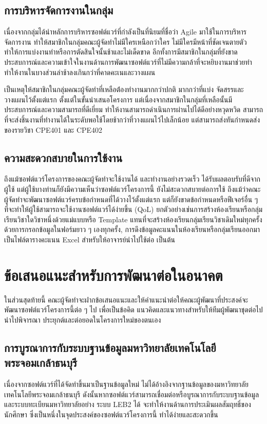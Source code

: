 \documentclass[12pt,one side,openright,a4paper]{cpe-thesis-th}
\newcommand{\thaijustify}[1]{%
  \par\hspace{30pt}\justifying
  #1
}
\begin{document}
    \subsection{การบริหารจัดการงานในกลุ่ม}
        \thaijustify{
            เนื่องจากกลุ่มได้นำหลักการบริหารซอฟต์แวร์ที่กำลังเป็นที่นิยมที่ชื่อว่า Agile มาใช้ในการบริหารจัดการงาน ทำให้สมาชิกในกลุ่มคณะผู้จัดทำไม่มีใครเหนือกว่าใคร ไม่มีใครมีหน้าที่ชัดเจนตายตัว ทำให้การแบ่งงานทำหรือการตัดสินใจนั้นช้าและไม่เด็ดขาด อีกทั้งการมีสมาชิกในกลุ่มที่ยังขาดประสบการณ์และความเข้าใจในงานด้านการพัฒนาซอฟต์แวร์ที่ไม่มีความกล้าที่จะหยิบงานมาช่วยทำ ทำให้งานในบางส่วนล่าช้าลงเกินกว่าที่คาดคะเนและวางแผน
        }
        \thaijustify{
            เป็นเหตุให้สมาชิกในกลุ่มคณะผู้จัดทำที่เหลือต้่องทำงานมากกว่าปกติ มากกว่าที่แบ่ง จัดสรรและวางแผนไว้ตั้งแต่แรก ตั้งแต่ในขั้นนำเสนอโครงการ แต่เนื่องจากสมาชิกในกลุ่มที่เหลือนั้นมีประสบการณ์และความสามารถที่ดีเยี่ยม ทำให้งานสามารถดำเนินการผ่านไปได้ดีอย่างหวุดหวิด สามารถที่จะส่งชิ้นงานที่ทำงานได้ในระดับพอใช้โดยช้ากว่าที่วางแผนไว้ไปเล็กน้อย แต่สามารถส่งทันกำหนดส่งของรายวิชา CPE401 และ CPE402
        }
    \subsection{ความสะดวกสบายในการใช้งาน}
        \thaijustify{
            ถึงแม้ซอฟต์แวร์โครงการของคณะผู้จัดทำจะใช้งานได้ และทำงานอย่างรวดเร็ว ได้รับผลตอบรับที่ดีจากผู้ใช้ แต่ผู้ใช้บางท่านก็ยังมีความเห็นว่าซอฟต์แวร์โครงการนี้ ยังไม่สะดวกสบายต่อการใช้ ถึงแม้ว่าคณะผู้จัดทำจะพัฒนาซอฟต์แวร์ครบข้อกำหนดที่ได้วางไว้ตั้งแต่แรก แต่ก็ยังขาดข้อกำหนดหรือฟีเจอร์อื่น ๆ ที่จะทำให้ผู้ใช้สามารถจะใช้งานซอฟต์แวร์ได้ง่ายขึ้น (QoL) ยกตัวอย่างเช่นการสร้างห้องเรียนหรือกลุ่มเรียนวิชาใดวิชาหนึ่งด้วยแม่แบบหรือ Template แทนที่จะสร้างห้องเรียนกลุ่มเรียนวิชาเดิมใหม่ทุกครั้งด้วยการกรอกข้อมูลในฟอร์มยาว ๆ เองทุกครั้ง, การดึงข้อมูลคะแนนในห้องเรียนหรือกลุ่มเรียนออกมาเป็นไฟล์ตารางคะแนน Excel สำหรับให้อาจารย์นำไปใช้ต่อ เป็นต้น
        }
\section{ข้อเสนอแนะสำหรับการพัฒนาต่อในอนาคต}
    ในส่วนสุดท้ายนี้ คณะผู้จัดทำจะฝากข้อเสนอแนะและให้คำแนะนำต่อให้คณะผู้พัฒนาที่ประสงค์จะพัฒนาซอฟต์แวร์โครงการนี้ต่อ ๆ ไป เพื่อเป็นข้อคิด แนวคิดและแนวทางสำหรับให้ทีมผู้พัฒนาชุดต่อไปนำไปพิจารณา ประยุกต์และต่อยอดในโครงการใหม่ของตนเอง
    \subsection{การบูรณาการกับระบบฐานข้อมูลมหาวิทยาลัยเทคโนโลยีพระจอมเกล้าธนบุรี}
        \thaijustify{
            เนื่องจากซอฟต์แวร์ที่ได้จัดทำขึ้นมาเป็นฐานข้อมูลใหม่ ไม่ได้อ้างอิงจากฐานข้อมูลของมหาวิทยาลัยเทคโนโลยีพระจอมเกล้าธนบุรี ดังนั้นหากซอฟต์แวร์สามารถเชื่อมต่อหรือบูรณาการกับระบบฐานข้อมูลและระบบทะเบียนมหาวิทยาลัยอย่าง ระบบ LEB2 ได้ จะทำให้งานด้านการประเมินผลสัมฤทธิ์ของนักศึกษา ซึ่งเป็นหนึ่งในจุดประสงค์ของซอฟต์แวร์โครงการนี้ ทำได้ง่ายและสะดวกขึ้น
        }
\end{document}
